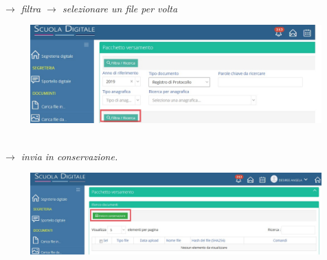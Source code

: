 \documentclass[a4paper,italian,12pt]{book}
\begin{document}
\\
\\
\\
\\
\\
\\
\\
\\
\\
\\
\\
\\
\\
\\
\\
\\
\textit{$\to$ filtra $\to$ selezionare un file per volta}
\begin{figure}[ht]
\includegraphics[scale=0.5]{Figure/filtra_pacc_vers.jpg} 
\end{figure}\\
\textit{$\to$ invia in conservazione.}
\begin{figure}[ht]
\centering
\includegraphics[scale=0.5]{Figure/invia_cons.jpg} 
\end{figure}\\
\end{document}
